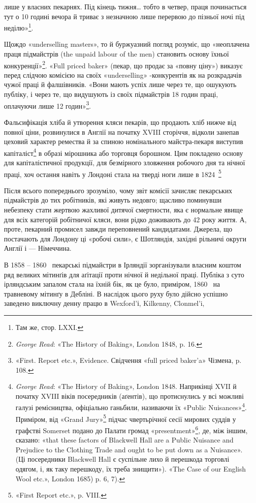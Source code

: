 \parcont{}  %
лише у власних пекарнях. Під кінець тижня\dots{} тобто в четвер,
праця починається тут о 10 годині вечора й триває з незначною
лише перервою до пізньої ночі під неділю»\footnote{
Там же, стор. LXXI.
}.

Щождо «underselling masters», то й буржуазний погляд розуміє,
що «неоплачена праця підмайстрів (the unpaid labour of
the men) становить основу їхньої конкуренції»\footnote{
\emph{George Read}: «The History of Baking», London 1848, p. 16.
}. «Full priced
baker» (пекар, що продає за «повну ціну») виказує перед слідчою
комісією на своїх «underselling» -конкурентів як на розкрадачів
чужої праці й фалшівників. «Вони мають успіх лише
через те, що ошукують публіку, і через те, що видушують із
своїх підмайстрів 18 годин праці, оплачуючи лише 12 годин»\footnote{
«First. Report etc.», Evidence. Свідчення «full priced baker’a» Чізмена,
p. 108.
}.

Фальсифікація хліба й утворення кляси пекарів, що продають
хліб нижче від повної ціни, розвинулися в Англії на початку
XVIII сторіччя, відколи занепав цеховий характер ремества й
за спиною номінального майстра-пекаря виступив капіталіст\footnote{
\emph{George Read}: «The History of Baking», London 1848. Наприкінці
XVII й початку XVIII віків посередників (аґентів), що протиснулись
у всі можливі галузі ремісництва, офіціально ганьбили, називаючи
їх «Public Nuisances»\footnote*{суспільним лихом. \emph{Ред.}}.
Приміром, від «Grand Jury»\footnote*{Велике жюрі — суд присяжних. \emph{Ред.}}
підчас чвертьрічної
сесії мирових суддів у графстві Somerset подано до Палати громад
«presentment»\footnote*{внесення. \emph{Ред.}},
де, між іншим, сказано: «that these factors of Blackwell Hall
are a Public Nuisance and Prejudice to the Clothing Trade and ought to be
put down as a Nuisance». (Ці посередники Blackwell Hall є суспільне лихо
й перешкода торговлі одягом, і, як таку перешкоду, їх треба знищити»).
«The Case of our English Wool etc.», London 1685) p. 6, 7).
} в образі мірошника або торговця борошном. Цим покладено основу
для капіталістичної продукції, для безмірного зловження робочого
дня та нічної праці, хоч остання навіть у Лондоні стала на тверді
ноги лише в 1824~\footnote{«First Report etc.», p. VIII.}

Після всього попереднього зрозуміло, чому звіт комісії зачисляє
пекарських підмайстрів до тих робітників, які живуть
недовго; щасливо поминувши небезпеку стати жертвою жахливої
дитячої смертности, яка є нормальне явище для всіх категорій
робітничої кляси, вони рідко доживають до 42 року життя. А, проте,
пекарний промисел завжди переповнений кандидатами. Джерела,
що постачають для Лондону ці «робочі сили», є Шотляндія, західні
рільничі округи Англії і — Німеччина.

В 1858 – 1860~ пекарські підмайстри в Ірляндії зорганізували
власним коштом ряд великих мітинґів для аґітації проти
нічної й недільної праці. Публіка з суто ірляндським запалом
стала на їхній бік, як це було, приміром, 1860~ на травневому
мітинґу в Дебліні. В наслідок цього руху було дійсно успішно
заведено виключну денну працю в Wexford’і, Kilkenny, Clonmel’i,
\parbreak{}  %
